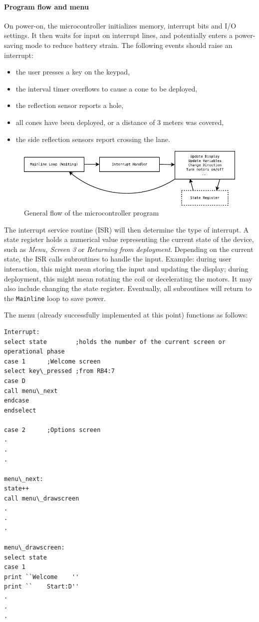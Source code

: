 \documentclass[11pt]{report}
\begin{document}
\paragraph{Program flow and menu}
On power-on, the microcontroller initializes memory, interrupt bits and I/O settings. It then waits for input on interrupt lines, and potentially enters a power-saving mode to reduce battery strain. The following events should raise an interrupt:
\begin{itemize}
  \item{the user presses a key on the keypad,}
  \item{the interval timer overflows to cause a cone to be deployed,}
  \item{the reflection sensor reports a hole,}
  \item{all cones have been deployed, or a distance of 3 meters was covered,}
  \item{the side reflection sensors report crossing the lane.}
\end{itemize}
\begin{figure}
  \centering
  \includegraphics{program_flow.pdf}
  \caption{General flow of the microcontroller program}
  \label{fig:programflow}
\end{figure}
The interrupt service routine (ISR) will then determine the type of interrupt. A state register holds a numerical value representing the current state of the device, such as \textit{Menu, Screen 3} or \textit{Returning from deployment}. Depending on the current state, the ISR calls subroutines to handle the input. Example: during user interaction, this might mean storing the input and updating the display; during deployment, this might mean rotating the coil or decelerating the motors. It may also include changing the state register. Eventually, all subroutines will return to the \texttt{Mainline} loop to save power.

The menu (already successfully implemented at this point) functions as follows: 

\begin{verbatim}
Interrupt:
select state		;holds the number of the current screen or operational phase
case 1		;Welcome screen
select key\_pressed	;from RB4:7
case D
call menu\_next
endcase
endselect

case 2		;Options screen
.
.
.

menu\_next:
state++
call menu\_drawscreen
.
.
.

menu\_drawscreen:
select state
case 1
print ``Welcome    ''
print ``    Start:D''
.
.
.
\end{verbatim}
\end{document}
